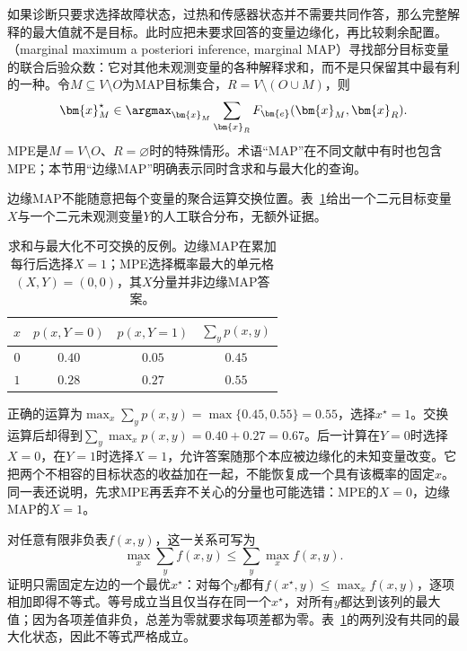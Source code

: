 如果诊断只要求选择故障状态，过热和传感器状态并不需要共同作答，那么完整解释的最大值就不是目标。此时应把未要求回答的变量边缘化，再比较剩余配置。（marginal maximum a posteriori inference, marginal MAP）寻找部分目标变量的联合后验众数：它对其他未观测变量的各种解释求和，而不是只保留其中最有利的一种。令$M\subseteq V\setminus O$为MAP目标集合，$R=V\setminus(O\cup M)$，则
\begin{equation}
  \bm{x}_M^\star
  \in\argmax_{\bm{x}_M}\sum_{\bm{x}_R}
       F_{\bm{e}}(\bm{x}_M,\bm{x}_R).
  \label{eq:pgm-elimination-map-objective}
\end{equation}
MPE是$M=V\setminus O$、$R=\varnothing$时的特殊情形。术语“MAP”在不同文献中有时也包含MPE；本节用“边缘MAP”明确表示同时含求和与最大化的查询。

边缘MAP不能随意把每个变量的聚合运算交换位置。表~\ref{tab:pgm-elimination-map-counterexample}给出一个二元目标变量$X$与一个二元未观测变量$Y$的人工联合分布，无额外证据。

\begin{table}[htbp]
  \centering
  \begin{tabular}{cccc}
    \toprule
    $x$ & $p(x,Y=0)$ & $p(x,Y=1)$ & $\sum_y p(x,y)$\\
    \midrule
    $0$ & $0.40$ & $0.05$ & $0.45$\\
    $1$ & $0.28$ & $0.27$ & $0.55$\\
    \bottomrule
  \end{tabular}
  \caption{求和与最大化不可交换的反例。边缘MAP在累加每行后选择$X=1$；MPE选择概率最大的单元格$(X,Y)=(0,0)$，其$X$分量并非边缘MAP答案。}
  \label{tab:pgm-elimination-map-counterexample}
\end{table}

正确的运算为$\max_x\sum_y p(x,y)=\max\{0.45,0.55\}=0.55$，选择$x^\star=1$。交换运算后却得到$\sum_y\max_x p(x,y)=0.40+0.27=0.67$。后一计算在$Y=0$时选择$X=0$，在$Y=1$时选择$X=1$，允许答案随那个本应被边缘化的未知变量改变。它把两个不相容的目标状态的收益加在一起，不能恢复成一个具有该概率的固定$x$。同一表还说明，先求MPE再丢弃不关心的分量也可能选错：MPE的$X=0$，边缘MAP的$X=1$。

对任意有限非负表$f(x,y)$，这一关系可写为
\begin{equation}
  \max_x\sum_y f(x,y)
  \leq \sum_y\max_x f(x,y).
  \label{eq:pgm-elimination-sum-max-bound}
\end{equation}
证明只需固定左边的一个最优$x^\star$：对每个$y$都有$f(x^\star,y)\leq\max_x f(x,y)$，逐项相加即得不等式。等号成立当且仅当存在同一个$x^\star$，对所有$y$都达到该列的最大值；因为各项差值非负，总差为零就要求每项差都为零。表~\ref{tab:pgm-elimination-map-counterexample}的两列没有共同的最大化状态，因此不等式严格成立。

